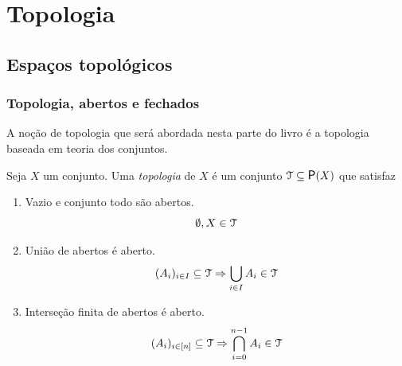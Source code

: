\chapter{Topologia}

\section{Espaços topológicos}

\subsection{Topologia, abertos e fechados}

A noção de topologia que será abordada nesta parte do livro é a topologia baseada em teoria dos conjuntos.

\begin{definition}
	Seja $X$ um conjunto. Uma \emph{topologia} de $X$ é um conjunto $\topo \subseteq \p(X)$ que satisfaz
	\begin{enumerate}
	\item Vazio e conjunto todo são abertos.
	\begin{equation*}
	\emptyset, X \in \mathcal{T}
	\end{equation*}

	\item União de abertos é aberto.
	\begin{equation*}
	(A_i)_{i \in I} \subseteq \mathcal{T} \Rightarrow \displaystyle\bigcup_{i \in I} A_i \in \mathcal{T}
	\end{equation*}

	\item Interseção finita de abertos é aberto.
	\begin{equation*}
	(A_i)_{i \in [n]} \subseteq \mathcal T \Rightarrow \displaystyle\bigcap_{i=0}^{n-1} A_i \in \mathcal{T}
	\end{equation*}
	\end{enumerate}
\end{definition}

